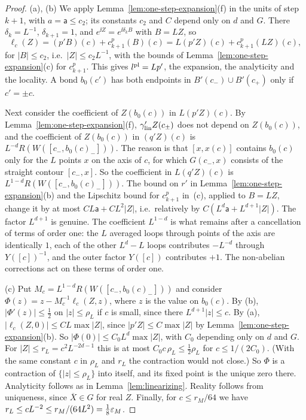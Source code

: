 \begin{proof}
(a), (b) We apply Lemma~\ref{lem:one-step-expansion}(f) in the units of step $k+1$, with $a=\mathsf a\le c_2$; its constants $c_2$ and $C$ depend only on $d$ and $G$. There $\delta_k=L^{-1}$, $\delta_{k+1}=1$, and $e^{\ii Z}=e^{\ii\delta_kB}$ with $B=LZ$, so
\[
\ell_c(Z)=(p'B)(c)+c^p_{k+1}(B)(c)=L(p'Z)(c)+c^p_{k+1}(LZ)(c),
\]
for $|B|\le c_2$, i.e.\ $|Z|\le c_2L^{-1}$, with the bounds of Lemma~\ref{lem:one-step-expansion}(c) for $c^p_{k+1}$. This gives $l^{\rm pl}=Lp'$, the expansion, the analyticity and the locality. A bond $b_0(c')$ has both endpoints in $B'(c_-)\cup B'(c_+)$ only if $c'=\pm c$.

Next consider the coefficient of $Z(b_0(c))$ in $L(p'Z)(c)$. By Lemma~\ref{lem:one-step-expansion}(f), $\gamma'_{\rm lin}Z(c_\pm)$ does not depend on $Z(b_0(c))$, and the coefficient of $Z(b_0(c))$ in $(q'Z)(c)$ is $L^{-d}R(W([c_-,b_0(c)_-]))$. The reason is that $[x,x(c)]$ contains $b_0(c)$ only for the $L$ points $x$ on the axis of $c$, for which $G(c_-,x)$ consists of the straight contour $[c_-,x]$. So the coefficient in $L(q'Z)(c)$ is $L^{1-d}R(W([c_-,b_0(c)_-]))$. The bound on $r'$ in Lemma~\ref{lem:one-step-expansion}(b) and the Lipschitz bound for $c^p_{k+1}$ in~(c), applied to $B=LZ$, change it by at most $CL\mathsf a+CL^2|Z|$, i.e.\ relatively by $C(L^d\mathsf a+L^{d+1}|Z|)$. The factor $L^{d+1}$ is genuine. The coefficient $L^{1-d}$ is what remains after a cancellation of terms of order one: the $L$ averaged loops through points of the axis are identically $1$, each of the other $L^d-L$ loops contributes $-L^{-d}$ through $Y([c])^{-1}$, and the outer factor $Y([c])$ contributes $+1$. The non-abelian corrections act on these terms of order one.

(c) Put $M_c=L^{1-d}R(W([c_-,b_0(c)_-]))$ and consider $\Phi(z)=z-M_c^{-1}\ell_c(Z,z)$, where $z$ is the value on $b_0(c)$. By (b), $|\Phi'(z)|\le\frac12$ on $|z|\le\rho_L$ if $c$ is small, since there $L^{d+1}|z|\le c$. By (a), $|\ell_c(Z,0)|\le CL\max|Z|$, since $|p'Z|\le C\max|Z|$ by Lemma~\ref{lem:one-step-expansion}(b). So $|\Phi(0)|\le C_0L^d\max|Z|$, with $C_0$ depending only on $d$ and $G$. For $|Z|\le r_L=c^2L^{-2d-1}$ this is at most $C_0c\,\rho_L\le\frac12\rho_L$ for $c\le1/(2C_0)$. (With the same constant $c$ in $\rho_L$ and $r_L$ the contraction would not close.) So $\Phi$ is a contraction of $\{|z|\le\rho_L\}$ into itself, and its fixed point is the unique zero there. Analyticity follows as in Lemma~\ref{lem:linearizing}. Reality follows from uniqueness, since $\overline X\in G$ for real $Z$. Finally, for $c\le r_M/64$ we have $r_L\le cL^{-2}\le r_M/(64L^2)=\frac18\varepsilon_M$.


\end{proof}
